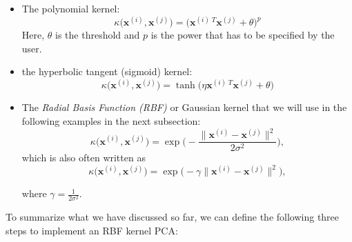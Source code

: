 \documentclass[letterpaper]{report}
\begin{document}
\begin{itemize}
\item The polynomial kernel: 
\[
\kappa \big( \mathbf{x}^{(i)}, \mathbf{x}^{(j)} \big) =  \big( \mathbf{x}^{(i)\;T} \mathbf{x}^{(j)} + \theta \big)^p
 \]
 Here, $\theta$ is the threshold and $p$ is the power that has to be specified by the user.
\item the hyperbolic tangent (sigmoid) kernel:
\[
\kappa \big( \mathbf{x}^{(i)}, \mathbf{x}^{(j)} \big) = \tanh \big( \eta \mathbf{x}^{(i)\; T} \mathbf{x}^{(j)} + \theta  \big)
\]
\item  The \textit{Radial Basis Function (RBF)} or Gaussian kernel that we will use in the following examples in the next subsection:
\[
\kappa \big( \mathbf{x}^{(i)}, \mathbf{x}^{(j)} \big) = \exp \Bigg( - \frac{\lVert  \mathbf{x}^{(i)} - \mathbf{x}^{(j)} \rVert^2}{2\sigma^2} \Bigg),
\]
which is also often written as 
\[
\kappa \big( \mathbf{x}^{(i)}, \mathbf{x}^{(j)} \big) = \exp \big( -\gamma \lVert  \mathbf{x}^{(i)} - \mathbf{x}^{(j)} \rVert^2 \big),
\]

where  $\gamma = \frac{1}{2 \sigma^2}$.

\end{itemize}

To summarize what we have discussed so far, we can define the following three steps to implement an RBF kernel PCA:
\end{document}
